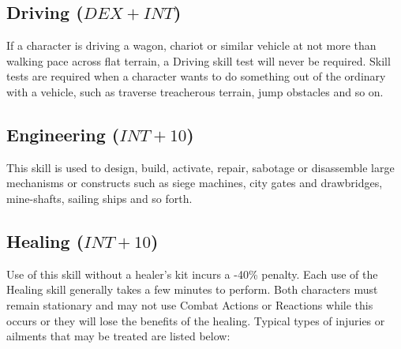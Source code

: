 \subsection{Driving ($DEX+INT$)}
If a character is driving a wagon, chariot or similar vehicle at not more than walking pace across flat terrain, a Driving skill test will never be required. Skill tests are required when a character wants to do something out of the ordinary with a vehicle, such as traverse treacherous terrain, jump obstacles and so on.

\subsection{Engineering ($INT+10$)}
This skill is used to design, build, activate, repair, sabotage or disassemble large mechanisms or constructs such as siege machines, city gates and drawbridges, mine-shafts, sailing ships and so forth. 

\subsection{Healing ($INT+10$)}
Use of this skill without a healer’s kit incurs a -40\% penalty. Each use of the Healing skill generally takes a few minutes to perform. Both characters must remain stationary and may not use Combat Actions or Reactions while this occurs or they will lose the benefits of the healing. Typical types of injuries or ailments that may be treated are listed below:

